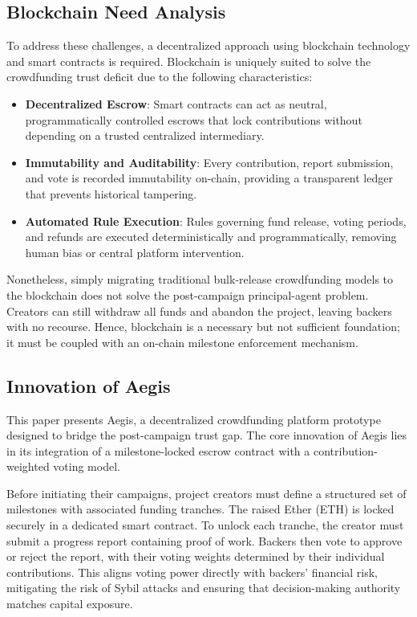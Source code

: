 \documentclass[conference]{IEEEtran}
\begin{document}
\subsection{Blockchain Need Analysis}
To address these challenges, a decentralized approach using blockchain technology and smart contracts is required. Blockchain is uniquely suited to solve the crowdfunding trust deficit due to the following characteristics:
\begin{itemize}
	\item \textbf{Decentralized Escrow}: Smart contracts can act as neutral, programmatically controlled escrows that lock contributions without depending on a trusted centralized intermediary.
	\item \textbf{Immutability and Auditability}: Every contribution, report submission, and vote is recorded immutability on-chain, providing a transparent ledger that prevents historical tampering.
	\item \textbf{Automated Rule Execution}: Rules governing fund release, voting periods, and refunds are executed deterministically and programmatically, removing human bias or central platform intervention.
\end{itemize}
Nonetheless, simply migrating traditional bulk-release crowdfunding models to the blockchain does not solve the post-campaign principal-agent problem. Creators can still withdraw all funds and abandon the project, leaving backers with no recourse. Hence, blockchain is a necessary but not sufficient foundation; it must be coupled with an on-chain milestone enforcement mechanism.

\subsection{Innovation of Aegis}
This paper presents Aegis, a decentralized crowdfunding platform prototype designed to bridge the post-campaign trust gap. The core innovation of Aegis lies in its integration of a milestone-locked escrow contract with a contribution-weighted voting model. 

Before initiating their campaigns, project creators must define a structured set of milestones with associated funding tranches. The raised Ether (ETH) is locked securely in a dedicated smart contract. To unlock each tranche, the creator must submit a progress report containing proof of work. Backers then vote to approve or reject the report, with their voting weights determined by their individual contributions. This aligns voting power directly with backers' financial risk, mitigating the risk of Sybil attacks and ensuring that decision-making authority matches capital exposure.
\end{document}

